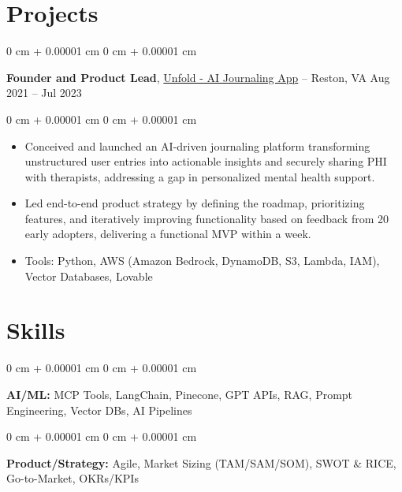 \documentclass[10pt, letterpaper]{article}
\newenvironment{highlights}{
    \begin{itemize}[
        topsep=0.10 cm,
        parsep=0.10 cm,
        partopsep=0pt,
        itemsep=0pt,
        leftmargin=0 cm + 10pt
    ]
}{
    \end{itemize}
} %
\newenvironment{onecolentry}{
    \begin{adjustwidth}{
        0 cm + 0.00001 cm
    }{
        0 cm + 0.00001 cm
    }
}{
    \end{adjustwidth}
} %
\newenvironment{twocolentry}[2][]{
    \onecolentry
    \def\secondColumn{#2}
    \setcolumnwidth{\fill, 4.5 cm}
    \begin{paracol}{2}
}{
    \switchcolumn \raggedleft \secondColumn
    \end{paracol}
    \endonecolentry
} %
\begin{document}
    

    
    \section{Projects}

        \begin{twocolentry}{
            Aug 2021 – Jul 2023
        }
            \textbf{Founder and Product Lead}, \href{https://www.unfoldzone.com/signin}{Unfold - AI Journaling App} -- Reston, VA\end{twocolentry}

        \vspace{0.10 cm}
        \begin{onecolentry}
            \begin{highlights}
                \item Conceived and launched an AI-driven journaling platform transforming unstructured user entries into actionable insights and securely sharing PHI with therapists, addressing a gap in personalized mental health support.


                \item Led end-to-end product strategy by defining the roadmap, prioritizing features, and iteratively improving functionality based on feedback from 20 early adopters, delivering a functional MVP within a week.
                \item Tools: Python, AWS (Amazon Bedrock, DynamoDB, S3, Lambda, IAM), Vector Databases, Lovable

            \end{highlights}
        \end{onecolentry}



    
    \section{Skills}



        
        \begin{onecolentry}
            \textbf{AI/ML:} MCP Tools, LangChain, Pinecone, GPT APIs, RAG, Prompt Engineering, Vector DBs, AI Pipelines

        \end{onecolentry}

        \vspace{0.1 cm}

        \begin{onecolentry}
            \textbf{Product/Strategy:} Agile, Market Sizing (TAM/SAM/SOM), SWOT \& RICE, Go-to-Market, OKRs/KPIs

        \end{onecolentry}
\end{document}
